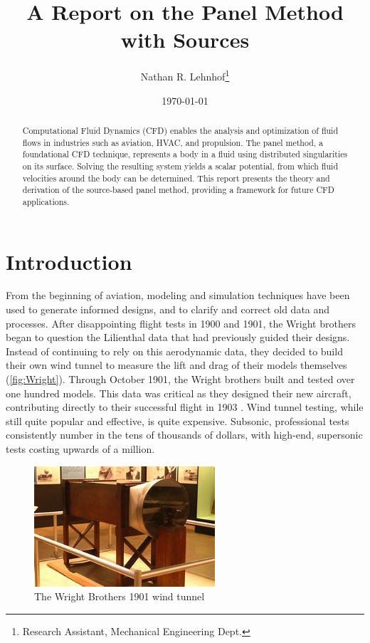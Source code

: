 \documentclass[conf]{new-aiaa} %
\begin{document}
\sloppy %

\title{A Report on the Panel Method with Sources}
\author{Nathan R. Lehnhof\footnote{Research Assistant, Mechanical Engineering Dept.}}
\date{\today}
\maketitle

\begin{abstract}
Computational Fluid Dynamics (CFD) enables the analysis and optimization of fluid flows in industries such as aviation, HVAC, and propulsion. 
The panel method, a foundational CFD technique, represents a body in a fluid using distributed singularities on its surface. 
Solving the resulting system yields a scalar potential, from which fluid velocities around the body can be determined. 
This report presents the theory and derivation of the source-based panel method, providing a framework for future CFD applications.
\end{abstract}
\section{Introduction}
From the beginning of aviation, modeling and simulation techniques have been used to generate informed designs, and to clarify and correct old data and processes. 
After disappointing flight tests in 1900 and 1901, the Wright brothers began to question the Lilienthal data that had previously guided their designs.
Instead of continuing to rely on this aerodynamic data, they decided to build their own wind tunnel to measure the lift and drag of their models themselves (\autoref{fig:Wright}). 
Through October 1901, the Wright brothers built and tested over one hundred models.
This data was critical as they designed their new aircraft, contributing directly to their successful flight in 1903 \cite{nasa_windtunnel}.
Wind tunnel testing, while still quite popular and effective, is quite expensive. 
Subsonic, professional tests consistently number in the tens of thousands of dollars, with high-end, supersonic tests costing upwards of a million.

\begin{figure}[h]
	\centering
	\includegraphics[width=0.6\textwidth]{wind_tunnel.jpg}
	\caption{The Wright Brothers 1901 wind tunnel}
	\label{fig:Wright}
\end{figure}
\end{document}
